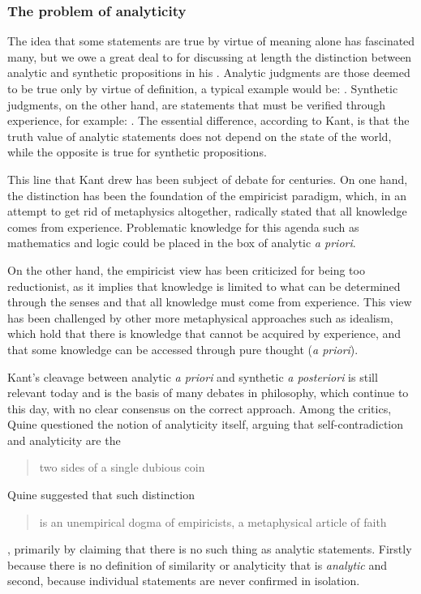\subsubsection*{The problem of analyticity}\label{sec:the-problem-of-analyticity}
The idea that some statements are true by virtue of meaning alone has fascinated many, but we owe a great deal to \cite{Kant1998} for discussing at length the distinction between analytic and synthetic propositions in his . Analytic judgments are those deemed to be true only by virtue of definition, a typical example would be: . Synthetic judgments, on the other hand, are statements that must be verified through experience, for example: . The essential difference, according to Kant, is that the truth value of analytic statements does not depend on the state of the world, while the opposite is true for synthetic propositions.

This line that Kant drew has been subject of debate for centuries. On one hand, the distinction has been the foundation of the empiricist paradigm, which, in an attempt to get rid of metaphysics altogether, radically stated that all knowledge comes from experience. Problematic knowledge for this agenda such as mathematics and logic could be placed in the box of analytic \emph{a priori}.

On the other hand, the empiricist view has been criticized for being too reductionist, as it implies that knowledge is limited to what can be determined through the senses and that all knowledge must come from experience. This view has been challenged by other more metaphysical approaches such as idealism, which hold that there is knowledge that cannot be acquired by experience, and that some knowledge can be accessed through pure thought (\emph{a priori}).

Kant's cleavage between analytic \emph{a priori} and synthetic \emph{a posteriori} is still relevant today and is the basis of many debates in philosophy, which continue to this day, with no clear consensus on the correct approach.
\SetCiteCommand{\citeyearpar}
Among the critics, Quine questioned the notion of analyticity itself, arguing that self-contradiction and analyticity are the \blockcquote{Quine1951}{two sides of a single dubious coin}. Quine suggested that such distinction \blockcquote{Quine1951}{is an unempirical dogma of empiricists, a metaphysical article of faith}, primarily by claiming that there is no such thing as analytic statements. Firstly because there is no definition of similarity or analyticity that is \emph{analytic} and second, because individual statements are never confirmed in isolation.
\SetCiteCommand{\citep}

